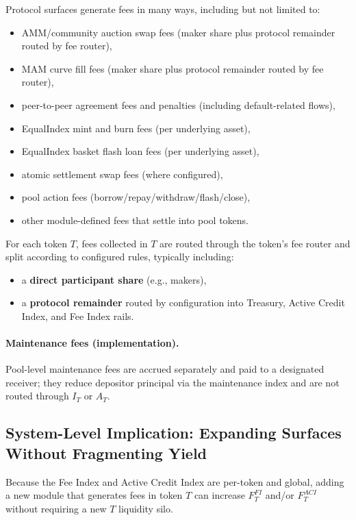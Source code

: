 \documentclass[version=preprint]{iacrcc}
\begin{document}
Protocol surfaces generate fees in many ways, including but not limited to:
\begin{itemize}
  \item AMM/community auction swap fees (maker share plus protocol remainder routed by fee router),
  \item MAM curve fill fees (maker share plus protocol remainder routed by fee router),
  \item peer-to-peer agreement fees and penalties (including default-related flows),
  \item EqualIndex mint and burn fees (per underlying asset),
  \item EqualIndex basket flash loan fees (per underlying asset),
  \item atomic settlement swap fees (where configured),
  \item pool action fees (borrow/repay/withdraw/flash/close),
  \item other module-defined fees that settle into pool tokens.
\end{itemize}

For each token $T$, fees collected in $T$ are routed through the token’s fee router and split according to configured rules, typically including:
\begin{itemize}
  \item a \textbf{direct participant share} (e.g., makers),
  \item a \textbf{protocol remainder} routed by configuration into Treasury, Active Credit Index, and Fee Index rails.
\end{itemize}

\paragraph{Maintenance fees (implementation).}
Pool-level maintenance fees are accrued separately and paid to a designated receiver; they reduce depositor principal via the maintenance index and are not routed through $I_T$ or $A_T$.

\subsection{System-Level Implication: Expanding Surfaces Without Fragmenting Yield}

Because the Fee Index and Active Credit Index are per-token and global, adding a new module that generates fees in token $T$ can increase $F^{FI}_T$ and/or $F^{ACI}_T$ without requiring a new $T$ liquidity silo.
\end{document}
